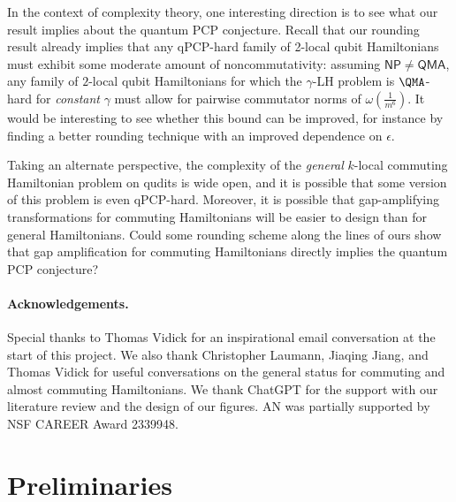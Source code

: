 \documentclass[11pt]{article}
\theoremstyle{plain}
\newif\ifanon
\begin{document}
In the context of complexity theory, one interesting direction is to see what our result implies about the quantum PCP conjecture. Recall that our rounding result already implies that any qPCP-hard family of 2-local qubit Hamiltonians must exhibit some moderate amount of noncommutativity: assuming $\mathsf{NP} \neq \mathsf{QMA}$, any
family of $2$-local qubit Hamiltonians for which the $\gamma$-LH problem is $\QMA$-hard for \emph{constant} $\gamma$ must allow for pairwise commutator norms of $\omega(\frac{1}{m^6})$. It would be interesting to see whether this bound can be improved, for instance by finding a better rounding technique with an improved dependence on $\epsilon$.

Taking an alternate perspective, the complexity of the \emph{general} $k$-local commuting Hamiltonian problem on qudits is wide open, and it is possible that some version of this problem is even qPCP-hard. Moreover, it is possible that gap-amplifying transformations for commuting Hamiltonians will be easier to design than for general Hamiltonians. Could some rounding scheme along the lines of ours show that gap amplification for commuting Hamiltonians directly implies the quantum PCP conjecture?

\ifanon
\else
\paragraph{Acknowledgements.}
Special thanks to Thomas Vidick for an inspirational email conversation at the start of this project. We also thank Christopher Laumann, Jiaqing Jiang, and Thomas Vidick for useful conversations on the general status for commuting and almost commuting Hamiltonians. We thank ChatGPT for the support with our literature review and the design of our figures. AN was partially supported by NSF CAREER Award 2339948.
\fi

\section{Preliminaries}
\label{sec:background}
\end{document}

